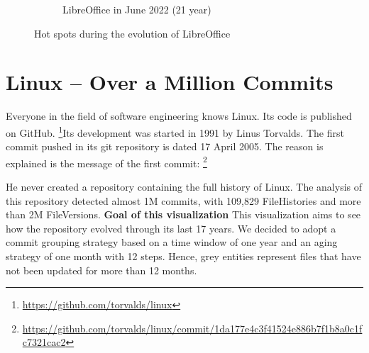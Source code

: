 \begin{figure}[ht]
\begin{subfigure}{0.48\textwidth}
        \caption{LibreOffice in June 2022 (21 year)} 
        \label{fig:Libre_V6_S6}
    \end{subfigure}
    
    \caption{Hot spots during the evolution of LibreOffice} 
    \label{fig:Libre_V6}
\end{figure}


\clearpage
\section{Linux – Over a Million Commits}
Everyone in the field of software engineering knows Linux. Its code is published on GitHub. \footnote{\url{https://github.com/torvalds/linux}}Its development was started in 1991 by Linus Torvalds. The first commit pushed in its git repository is dated 17 April 2005. The reason is explained is the message of the first commit: \footnote{\url{https://github.com/torvalds/linux/commit/1da177e4c3f41524e886b7f1b8a0c1fc7321cac2}}
\begin{displayquote}
\end{displayquote}
He never created a repository containing the full history of Linux. The analysis of this repository detected almost 1M commits, with 109,829 FileHistories and more than 2M FileVersions. 
\newline
\textbf{Goal of this visualization}
This visualization aims to see how the repository evolved through its last 17 years. We decided to adopt a commit grouping strategy based on a time window of one year and an aging strategy of one month with 12 steps. Hence, grey entities represent files that have not been updated for more than 12 months. 



